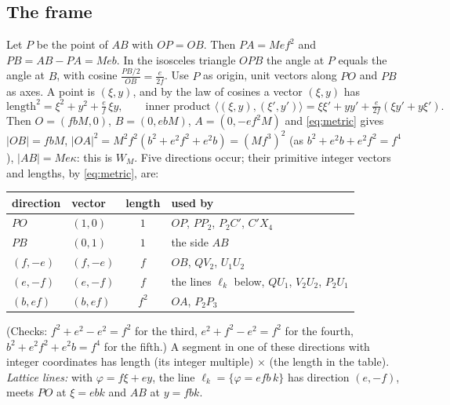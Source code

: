 \documentclass[11pt,reqno]{amsart}
\theoremstyle{plain}
\theoremstyle{definition}
\begin{document}
\subsection{The frame}\label{sub:frame}
Let $P$ be the point of $AB$ with $OP=OB$. Then $PA=Mef^2$ and $PB=AB-PA=Meb$. In the isosceles triangle $OPB$ the angle at $P$ equals the angle at $B$, with cosine $\frac{PB/2}{OB}=\frac{e}{2f}$. Use $P$ as origin, unit vectors along $PO$ and $PB$ as axes. A point is $(\xi,y)$, and by the law of cosines a vector $(\xi,y)$ has
\begin{equation}\label{eq:metric}
\text{length}^2=\xi^2+y^2+\tfrac ef\,\xi y,\qquad \text{inner product }\langle(\xi,y),(\xi',y')\rangle=\xi\xi'+yy'+\tfrac{e}{2f}(\xi y'+y\xi').
\end{equation}
Then $O=(fbM,0)$, $B=(0,ebM)$, $A=(0,-ef^2M)$ and \eqref{eq:metric} gives $|OB|=fbM$, $|OA|^2=M^2f^2(b^2+e^2f^2+e^2b)=(Mf^3)^2$ (as $b^2+e^2b+e^2f^2=f^4$), $|AB|=Me\kappa$: this is $W_M$. Five directions occur; their primitive integer vectors and lengths, by \eqref{eq:metric}, are:
\begin{center}\small
\begin{tabular}{@{}llcl@{}}
\toprule
direction & vector & length & used by\\
\midrule
$PO$ & $(1,0)$ & $1$ & $OP$, $PP_2$, $P_2C'$, $C'X_4$\\
$PB$ & $(0,1)$ & $1$ & the side $AB$\\
$(f,-e)$ & $(f,-e)$ & $f$ & $OB$, $QV_2$, $U_1U_2$\\
$(e,-f)$ & $(e,-f)$ & $f$ & the lines $\ell_k$ below, $QU_1$, $V_2U_2$, $P_2U_1$\\
$(b,ef)$ & $(b,ef)$ & $f^2$ & $OA$, $P_2P_3$\\
\bottomrule
\end{tabular}
\end{center}
(Checks: $f^2+e^2-e^2=f^2$ for the third, $e^2+f^2-e^2=f^2$ for the fourth, $b^2+e^2f^2+e^2b=f^4$ for the fifth.) A segment in one of these directions with integer coordinates has length (its integer multiple) $\times$ (the length in the table). \emph{Lattice lines:} with $\varphi=f\xi+ey$, the line $\ell_k=\{\varphi=efb\,k\}$ has direction $(e,-f)$, meets $PO$ at $\xi=ebk$ and $AB$ at $y=fbk$.
\end{document}
